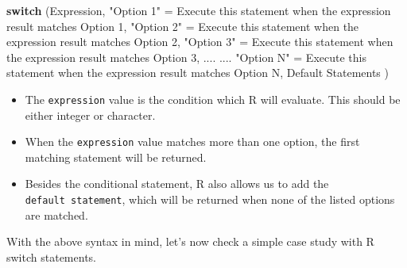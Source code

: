 \documentclass[12pt,]{krantz}
\newenvironment{Shaded}{\begin{snugshade}}{\end{snugshade}}
\newcommand{\DecValTok}[1]{\textcolor[rgb]{0.06,0.06,0.06}{#1}}
\newcommand{\StringTok}[1]{\textcolor[rgb]{0.5,0.5,0.5}{#1}}
\newcommand{\ControlFlowTok}[1]{\textcolor[rgb]{0.27,0.27,0.27}{\textbf{#1}}}
\newcommand{\NormalTok}[1]{#1}
\providecommand{\tightlist}{%
  \setlength{\itemsep}{0pt}\setlength{\parskip}{0pt}}
\begin{document}
\begin{Shaded}
\begin{Highlighting}[]
\ControlFlowTok{switch}\NormalTok{ (Expression,}
        \StringTok{"Option 1"}\NormalTok{ =}\StringTok{ }\NormalTok{Execute this statement when the expression result matches Option }\DecValTok{1}\NormalTok{,}
        \StringTok{"Option 2"}\NormalTok{ =}\StringTok{ }\NormalTok{Execute this statement when the expression result matches Option }\DecValTok{2}\NormalTok{,}
        \StringTok{"Option 3"}\NormalTok{ =}\StringTok{ }\NormalTok{Execute this statement when the expression result matches Option }\DecValTok{3}\NormalTok{,}
\NormalTok{        ....}
\NormalTok{        ....}
        \StringTok{"Option N"}\NormalTok{ =}\StringTok{ }\NormalTok{Execute this statement when the expression result matches Option N,}
\NormalTok{        Default Statements}
\NormalTok{)}
\end{Highlighting}
\end{Shaded}

\begin{itemize}
\tightlist
\item
  The \texttt{expression} value is the condition which R will evaluate.
  This should be either integer or character.
\item
  When the \texttt{expression} value matches more than one option, the
  first matching statement will be returned.
\item
  Besides the conditional statement, R also allows us to add the
  \texttt{default\ statement}, which will be returned when none of the
  listed options are matched.
\end{itemize}

With the above syntax in mind, let's now check a simple case study with
R switch statements.
\end{document}
